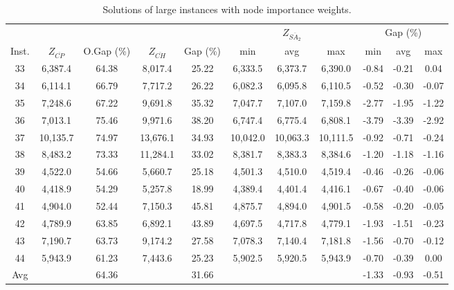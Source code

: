 \documentclass[11pt]{article}
\begin{document}
\begin{table}[H]
    \footnotesize
    \centering
\begin{tabular}{ccc ccc ccc cc}
\toprule
&  &  &  &  & \multicolumn{3}{c}{$Z_{\overline{SA_2}}$} & \multicolumn{3}{c}{Gap (\%)} \\ \cmidrule(l){6-11} 
Inst. & $Z_{\overline{CP}}$ & O.Gap (\%) & $Z_{\overline{CH}}$ & Gap (\%) & min & avg & max & min & avg & max \\ \midrule
\multicolumn{1}{c|}{33} & 6,387.4 & 64.38 & 8,017.4 & 25.22 & 6,333.5 & 6,373.7 & 6,390.0 & -0.84 & -0.21 & 0.04 \\
\multicolumn{1}{c|}{34} & 6,114.1 & 66.79 & 7,717.2 & 26.22 & 6,082.3 & 6,095.8 & 6,110.5 & -0.52 & -0.30 & -0.07 \\
\multicolumn{1}{c|}{35} & 7,248.6 & 67.22 & 9,691.8 & 35.32 & 7,047.7 & 7,107.0 & 7,159.8 & -2.77 & -1.95 & -1.22 \\
\multicolumn{1}{c|}{36} & 7,013.1 & 75.46 & 9,971.6 & 38.20 & 6,747.4 & 6,775.4 & 6,808.1 & -3.79 & -3.39 & -2.92 \\
\multicolumn{1}{c|}{37} & 10,135.7 & 74.97 & 13,676.1 & 34.93 & 10,042.0 & 10,063.3 & 10,111.5 & -0.92 & -0.71 & -0.24 \\
\multicolumn{1}{c|}{38} & 8,483.2 & 73.33 &  11,284.1 & 33.02 & 8,381.7 & 8,383.3 & 8,384.6 & -1.20 & -1.18 & -1.16 \\ 
\multicolumn{1}{c|}{39} & 4,522.0 & 54.66 & 5,660.7 & 25.18 & 4,501.3 & 4,510.0 & 4,519.4 & -0.46 & -0.26 & -0.06 \\
\multicolumn{1}{c|}{40} & 4,418.9 & 54.29 & 5,257.8 & 18.99 & 4,389.4 & 4,401.4 & 4,416.1 & -0.67 & -0.40 & -0.06 \\
\multicolumn{1}{c|}{41} & 4,904.0 & 52.44 & 7,150.3 & 45.81 & 4,875.7 & 4,894.0 & 4,901.5 & -0.58 & -0.20 & -0.05 \\
\multicolumn{1}{c|}{42} & 4,789.9 & 63.85 & 6,892.1 & 43.89 & 4,697.5 & 4,717.8 & 4,779.1 & -1.93 & -1.51 & -0.23 \\
\multicolumn{1}{c|}{43} & 7,190.7 & 63.73 & 9,174.2 & 27.58 & 7,078.3 & 7,140.4 & 7,181.8 & -1.56 & -0.70 & -0.12 \\
\multicolumn{1}{c|}{44} & 5,943.9 & 61.23 & 7,443.6 & 25.23 & 5,902.5 & 5,920.5 & 5,943.9 & -0.70 & -0.39 & 0.00 \\ \hline\hline
\multicolumn{1}{c|}{Avg} &  &  64.36  &  &  31.66  &  &  &  & -1.33 & -0.93 & -0.51 \\ \bottomrule
\end{tabular}
\caption{Solutions of large instances with node importance weights.}
	\label{large_result_new_obj}%
\end{table}
\end{document}
